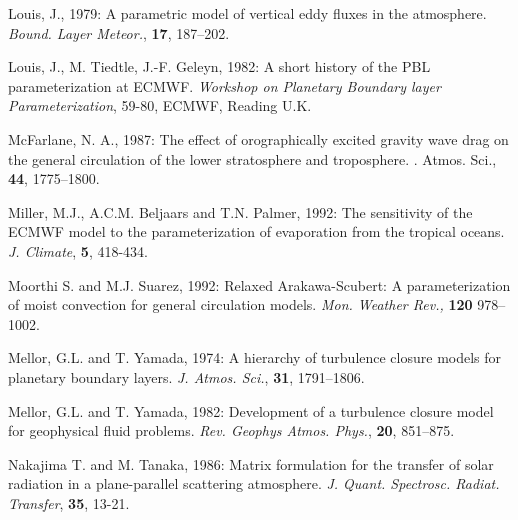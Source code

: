 \begin{description}
\item Louis, J., 1979:
      A parametric model of vertical eddy fluxes in the
      atmosphere.
      {\it Bound. Layer Meteor.}, {\bf 17}, 187--202.

\item Louis, J., M. Tiedtle, J.-F. Geleyn, 1982:
      A short history of the PBL parameterization at ECMWF.
      {\it Workshop on Planetary Boundary layer Parameterization},
      59-80, ECMWF, Reading U.K.

\item McFarlane, N. A., 1987:
      The effect of orographically excited gravity wave drag
      on the general circulation of
      the lower stratosphere and troposphere.
      {\itJ. Atmos. Sci.}, {\bf 44}, 1775–1800.

\item Miller, M.J., A.C.M. Beljaars and T.N. Palmer, 1992:
      The sensitivity of the ECMWF model
      to the parameterization of evaporation from the tropical oceans.
      {\it J. Climate}, {\bf 5}, 418-434.

\item Moorthi S. and M.J. Suarez, 1992:
      Relaxed Arakawa-Scubert: A parameterization of moist convection
      for general circulation models.
      {\em Mon. Weather Rev.,\/} {\bf 120} 978--1002.

\item Mellor, G.L. and T. Yamada, 1974:
      A hierarchy of turbulence closure models
      for planetary boundary layers.
      {\it J. Atmos. Sci.}, {\bf 31}, 1791--1806.

\item Mellor, G.L. and T. Yamada, 1982:
      Development of a turbulence closure
      model for geophysical fluid problems.
      {\it Rev. Geophys Atmos. Phys.}, {\bf 20}, 851--875.

\item Nakajima T. and M. Tanaka, 1986:
      Matrix formulation for the transfer of solar radiation
      in a plane-parallel scattering atmosphere.
      {\it J. Quant. Spectrosc. Radiat. Transfer}, {\bf 35}, 13-21.

\end{description}
